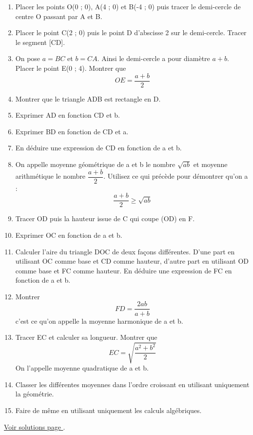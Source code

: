 \begin{enumerate}[label=C\arabic*)]
	\item Placer les points O(0 ; 0), A(4 ; 0) et B(-4 ; 0) puis tracer le demi-cercle de centre O passant par A et B.
	\item Placer le point C(2 ; 0) puis le point D d'abscisse 2 sur le demi-cercle. Tracer le segment [CD].
	\item On pose $a = BC$ et $b = CA$. Ainsi le demi-cercle a pour diamètre $a + b$. Placer le point E(0 ; 4). Montrer que \[OE = \dfrac{a + b}{2}\]
	\item Montrer que le triangle ADB est rectangle en D.
	\item Exprimer AD en fonction CD et b.
	\item Exprimer BD en fonction de CD et a.
	\item En déduire une expression de CD en fonction de a et b.
	\item On appelle moyenne géométrique de a et b le nombre $\sqrt{ab}$ et moyenne arithmétique le nombre $\dfrac{a + b}{2}$. Utilisez ce qui précède pour démontrer qu'on a : \[\dfrac{a+b}{2} \geq \sqrt{ab}\]
	\item Tracer OD puis la hauteur issue de C qui coupe (OD) en F. 
	\item Exprimer OC en fonction de a et b.
	\item Calculer l'aire du triangle DOC de deux façons différentes. D'une part en utilisant OC comme base et CD comme hauteur, d'autre part en utilisant OD comme base et FC comme hauteur. En déduire une expression de FC en fonction de a et b.
	\item Montrer \[FD = \dfrac{2ab}{a + b}\] c'est ce qu'on appelle la moyenne harmonique de a et b.
	\item Tracer EC et calculer sa longueur. Montrer que \[EC = \sqrt{\dfrac{a^2 + b^2}{2}}\]
	On l'appelle moyenne quadratique de a et b.
	\item Classer les différentes moyennes dans l'ordre croissant en utilisant uniquement la géométrie.
	\item Faire de même en utilisant uniquement les calculs algébriques.
\end{enumerate}

\hyperref[sol:niveau20]{Voir solutions page \pageref{sol:niveau20}}.